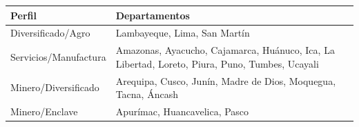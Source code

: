 \begin{tabular}{p{.27\linewidth}p{.65\linewidth}}
\toprule
Perfil & Departamentos \\
\midrule
Diversificado/Agro & Lambayeque, Lima, San Martín \\
Servicios/Manufactura & Amazonas, Ayacucho, Cajamarca, Huánuco, Ica, La Libertad, Loreto, Piura, Puno, Tumbes, Ucayali \\
Minero/Diversificado & Arequipa, Cusco, Junín, Madre de Dios, Moquegua, Tacna, Áncash \\
Minero/Enclave & Apurímac, Huancavelica, Pasco \\
\bottomrule
\end{tabular}
